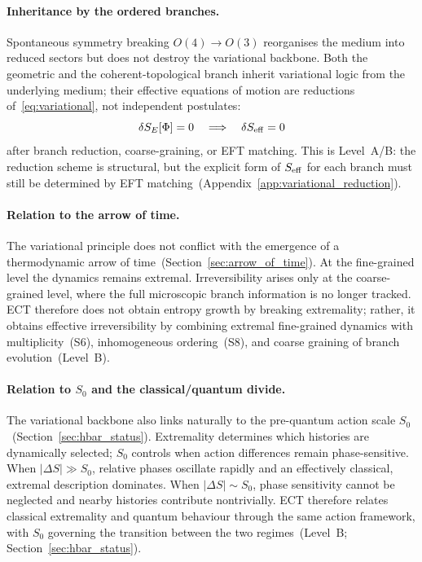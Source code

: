 \documentclass[11pt,a4paper]{article}
\numberwithin{equation}{section}
\begin{document}
\paragraph{Inheritance by the ordered branches.}
Spontaneous symmetry breaking $O(4)\to O(3)$ reorganises the medium
into reduced sectors but does not destroy the variational backbone.
Both the geometric and the coherent-topological branch inherit
variational logic from the underlying medium; their effective equations
of motion are reductions of~\eqref{eq:variational}, not independent
postulates:
\begin{equation}
  \delta S_E[\Phi]=0
  \quad\Longrightarrow\quad
  \delta S_{\rm eff}=0
  \label{eq:delta_Seff_zero}
\end{equation}
after branch reduction, coarse-graining, or EFT matching.
This is Level~A/B: the reduction scheme is structural, but the explicit
form of $S_{\rm eff}$ for each branch must still be determined by EFT
matching~(Appendix~\ref{app:variational_reduction}).

\paragraph{Relation to the arrow of time.}
The variational principle does not conflict with the emergence of
a thermodynamic arrow of time~(Section~\ref{sec:arrow_of_time}).
At the fine-grained level the dynamics remains extremal.
Irreversibility arises only at the coarse-grained level, where the full
microscopic branch information is no longer tracked.
ECT therefore does not obtain entropy growth by breaking extremality;
rather, it obtains effective irreversibility by combining extremal
fine-grained dynamics with multiplicity~(S6), inhomogeneous
ordering~(S8), and coarse graining of branch evolution~(Level~B).

\paragraph{Relation to \texorpdfstring{$S_0$}{S0} and the classical/quantum divide.}
The variational backbone also links naturally to the pre-quantum action
scale $S_0$~(Section~\ref{sec:hbar_status}).
Extremality determines which histories are dynamically selected;
$S_0$ controls when action differences remain phase-sensitive.
When $|\Delta S|\gg S_0$, relative phases oscillate rapidly and an
effectively classical, extremal description dominates.
When $|\Delta S|\sim S_0$, phase sensitivity cannot be neglected and
nearby histories contribute nontrivially.
ECT therefore relates classical extremality and quantum behaviour
through the same action framework, with $S_0$ governing the transition
between the two regimes~(Level~B; Section~\ref{sec:hbar_status}).
\end{document}
